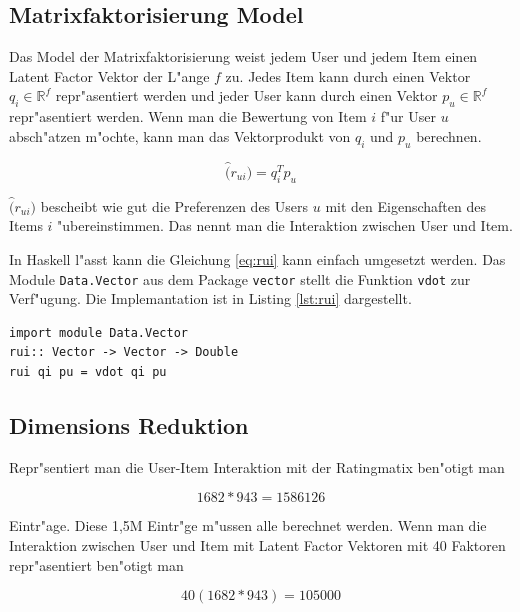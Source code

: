 \documentclass[a4paper, 12pt]{article}
\begin{document}
\subsection{Matrixfaktorisierung Model}
\label{sec:matrixfactorizationmodel}

Das Model der Matrixfaktorisierung weist jedem User und jedem Item einen Latent Factor Vektor der L"ange $f$ zu. Jedes Item kann durch einen Vektor $q_i \in \mathbb{R}^f$ repr"asentiert werden und jeder User kann durch einen Vektor $p_u \in \mathbb{R}^f$ repr"asentiert werden. Wenn man die Bewertung von Item $i$ f"ur User $u$ absch"atzen m"ochte, kann man das Vektorprodukt von $q_i$ und $p_u$ berechnen.

\begin{equation}
  \label{eq:rui}
  \hat(r_{ui}) = q_i^T p_u
\end{equation}

$\hat(r_{ui})$ bescheibt wie gut die Preferenzen des Users $u$ mit den Eigenschaften des Items $i$ "ubereinstimmen. Das nennt man die Interaktion zwischen User und Item.

In Haskell l"asst kann die Gleichung \ref{eq:rui} kann einfach umgesetzt werden. Das Module \verb|Data.Vector| aus dem Package \verb|vector| stellt die Funktion \verb|vdot| zur Verf"ugung. Die Implemantation ist in Listing \ref{lst:rui} dargestellt.

\begin{lstlisting}[caption=Implementation der Vorhersage, label=lst:rui]
import module Data.Vector
rui:: Vector -> Vector -> Double
rui qi pu = vdot qi pu
\end{lstlisting}

\subsection{Dimensions Reduktion}
\label{sec:dimred}

Repr"sentiert man die User-Item Interaktion mit der Ratingmatix ben"otigt man 

\begin{equation}
  \label{eq:dimre}
  1682 * 943 = 1586126
\end{equation}

Eintr"age. Diese 1,5M Eintr"ge m"ussen alle berechnet werden. Wenn man die Interaktion zwischen User und Item mit Latent Factor Vektoren mit 40 Faktoren repr"asentiert ben"otigt man 

\begin{equation}
  \label{eq:dimred}
  40(1682*943) = 105000
\end{equation}
\end{document}
